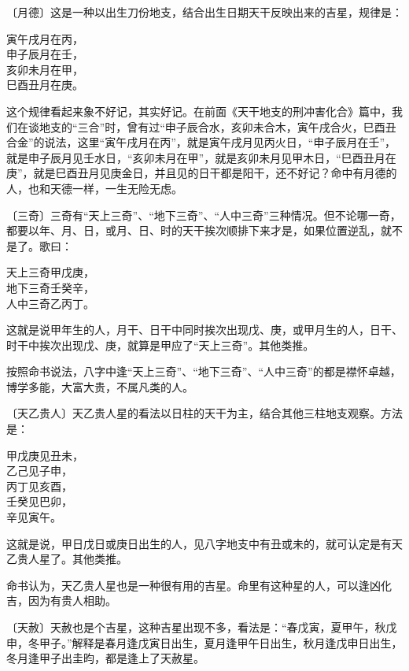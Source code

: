 \documentclass[a5paper,oneside,12pt]{ctexbook}
\newenvironment{tightcenter}{%
  \setlength\topsep{0pt}
  \setlength\parskip{0pt}
  \begin{center}\kaishu 
}{%
  \end{center}
}
\begin{document}
〔月德〕这是一种以出生刀份地支，结合出生日期天干反映出来的吉星，规律是：
\begin{tightcenter}
寅午戌月在丙，\\
申子辰月在壬，\\
亥卯未月在甲，\\
巳酉丑月在庚。\\
\end{tightcenter}
这个规律看起来象不好记，其实好记。在前面《天干地支的刑冲害化合》篇中，我们在谈地支的“三合”时，曾有过“申子辰合水，亥卯未合木，寅午戌合火，巳酉丑合金”的说法，这里“寅午戌月在丙”，就是寅午戌月见丙火日，“申子辰月在壬”，就是申子辰月见壬水日，“亥卯未月在甲”，就是亥卯未月见甲木日，“巳酉丑月在庚”，就是巳酉丑月见庚金日，并且见的日干都是阳干，还不好记？命中有月德的人，也和天德一样，一生无险无虑。

〔三奇〕三奇有“天上三奇”、“地下三奇”、“人中三奇”三种情况。但不论哪一奇，都要以年、月、日，或月、日、时的天干挨次顺排下来才是，如果位置逆乱，就不是了。歌曰：
\begin{tightcenter}
    天上三奇甲戊庚，\\
    地下三奇壬癸辛，\\
    人中三奇乙丙丁。\\  
\end{tightcenter}
这就是说甲年生的人，月干、日干中同时挨次出现戊、庚，或甲月生的人，日干、时干中挨次出现戊、庚，就算是甲应了“天上三奇”。其他类推。

按照命书说法，八字中逢“天上三奇”、“地下三奇”、“人中三奇”的都是襟怀卓越，博学多能，大富大贵，不属凡类的人。

〔天乙贵人〕天乙贵人星的看法以日柱的天干为主，结合其他三柱地支观察。方法是：
\begin{tightcenter}
    甲戊庚见丑未，\\
    乙己见子申，\\
    丙丁见亥酉，\\
    壬癸见巴卯，\\
    辛见寅午。\\
\end{tightcenter}
这就是说，甲日戊日或庚日出生的人，见八字地支中有丑或未的，就可认定是有天乙贵人星了。其他类推。

命书认为，天乙贵人星也是一种很有用的吉星。命里有这种星的人，可以逢凶化吉，因为有贵人相助。

〔天赦〕天赦也是个吉星，这种吉星出现不多，看法是：“春戊寅，夏甲午，秋戊申，冬甲子。”解释是春月逢戊寅日出生，夏月逢甲午日出生，秋月逢戊申日出生，冬月逢甲子出圭昀，都是逢上了天赦星。
\end{document}
